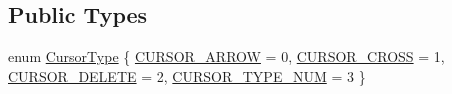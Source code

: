 \subsection*{Public Types}
\begin{DoxyCompactItemize}
\item 
enum \hyperlink{classWindow_a777c693a4c2b74e712839aa15189e07f}{Cursor\+Type} \{ \hyperlink{classWindow_a777c693a4c2b74e712839aa15189e07fadc371b755e3336f07c17227a754a829e}{C\+U\+R\+S\+O\+R\+\_\+\+A\+R\+R\+O\+W} = 0, 
\hyperlink{classWindow_a777c693a4c2b74e712839aa15189e07faf6561d7cc9ae11d29f3004c0f2ab33e3}{C\+U\+R\+S\+O\+R\+\_\+\+C\+R\+O\+S\+S} = 1, 
\hyperlink{classWindow_a777c693a4c2b74e712839aa15189e07fa2ed9ada326b2dfd626e2d2adcbd8691f}{C\+U\+R\+S\+O\+R\+\_\+\+D\+E\+L\+E\+T\+E} = 2, 
\hyperlink{classWindow_a777c693a4c2b74e712839aa15189e07fad4d3e8c6d4b72f1b918b63b0f18888d3}{C\+U\+R\+S\+O\+R\+\_\+\+T\+Y\+P\+E\+\_\+\+N\+U\+M} = 3
 \}
\end{DoxyCompactItemize}
